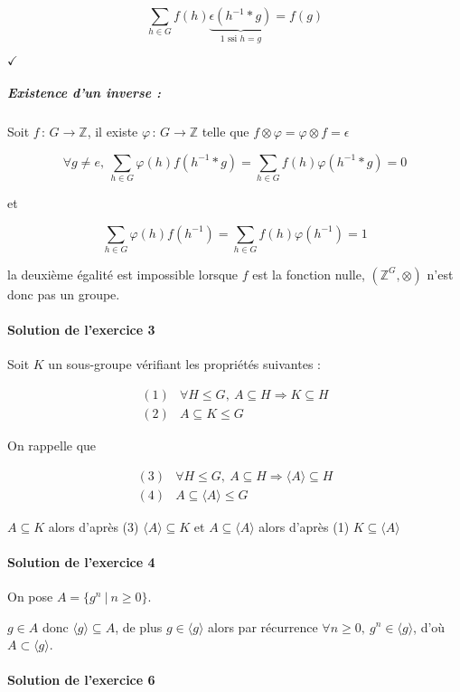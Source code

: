 \documentclass[]{article}
\theoremstyle{remark}
\theoremstyle{definition}
\newcommand{\checked}{
	\hfill$\checkmark$
}
\newcommand{\funcshort}[3]{
#1 \, : \, #2 \longrightarrow #3
}
\begin{document}
$$\sum_{h \in G}f(h)\underbrace{\epsilon(h^{-1}*g)}_{1 \text{ ssi } h = g}=f(g)$$

\checked

\subparagraph{Existence d'un inverse :}
Soit $\funcshort{f}{G}{\mathbb{Z}}$, il existe $\funcshort{\varphi}{G}{\mathbb{Z}}$ telle que $f \otimes \varphi = \varphi \otimes f = \epsilon$

$$\forall g \neq e, ~ \sum_{h \in G}\varphi(h)f(h^{-1}*g)=\sum_{h \in G}f(h)\varphi(h^{-1}*g)=0$$

et

$$\sum_{h \in G}\varphi(h)f(h^{-1})=\sum_{h \in G}f(h)\varphi(h^{-1})=1$$

la deuxième égalité est impossible lorsque $f$ est la fonction nulle, $\left(\mathbb{Z}^G, \otimes\right)$ n'est donc pas un groupe.

\paragraph{Solution de l'exercice 3}
Soit $K$ un sous-groupe vérifiant les propriétés suivantes :

$$
	\begin{array}{lc}
		(1) & \forall H \leqslant G, ~ A \subseteq H \Longrightarrow K \subseteq H \\
		(2) & A \subseteq K \leqslant G
	\end{array}
$$

On rappelle que 

$$
	\begin{array}{lc}
		(3) & \forall H \leqslant G, ~ A \subseteq H \Longrightarrow \langle A \rangle \subseteq H \\
		(4) & A \subseteq \langle A \rangle \leqslant G
	\end{array}
$$

$A \subseteq K$ alors d'après (3) $\langle A \rangle \subseteq K$ et $A \subseteq \langle A \rangle$ alors d'après (1) $K \subseteq \langle A \rangle$

\paragraph{Solution de l'exercice 4}
On pose $A = \{g^n ~ | ~ n \geqslant 0\}$.

$g \in A$ donc $\langle g \rangle \subseteq A$, de plus $g \in \langle g \rangle$ alors par récurrence $\forall n \geqslant 0, ~ g^n \in \langle g \rangle$, d'où $A \subset \langle g \rangle$.

\paragraph{Solution de l'exercice 6}
\end{document}
